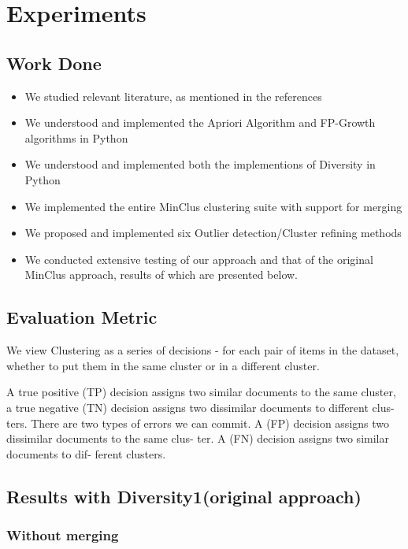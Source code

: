 \chapter{Experiments}
\label{Chapter5}

\section{Work Done}
\begin{itemize}
	\item We studied relevant literature, as mentioned in the references
	\item We understood and implemented the Apriori Algorithm and FP-Growth algorithms in Python
	\item We understood and implemented both the implementions of Diversity in Python
	\item We implemented the entire MinClus clustering suite with support for merging
	\item We proposed and implemented six Outlier detection/Cluster refining methods
	\item We conducted extensive testing of our approach and that of the original MinClus approach, results of which are presented below.
\end{itemize}

\section{Evaluation Metric}
We view Clustering as a series of decisions - for each pair of items in the dataset, whether to put them in the same cluster or in a different cluster.

A true positive (TP) decision assigns two
similar documents to the same cluster, a true negative (TN)
decision assigns two dissimilar documents to different clus-
ters. There are two types of errors we can commit. A (FP)
decision assigns two dissimilar documents to the same clus-
ter. A (FN) decision assigns two similar documents to dif-
ferent clusters.

\section{Results with Diversity1(original approach)}
\subsection{Without merging}

